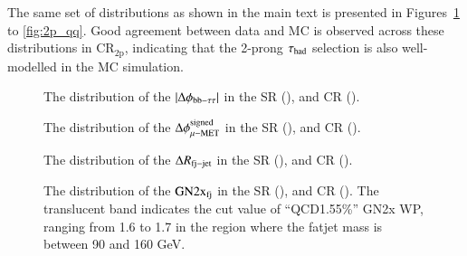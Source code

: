     The same set of distributions as shown in the main text is presented in Figures~\ref{fig:2p_absDphi_bbtt} to \ref{fig:2p_qq}. 
    Good agreement between data and MC is observed across these distributions in $\mathrm{CR}_\mathrm{2p}$, 
    indicating that the 2-prong $\tau_{\text{had}}$ selection is also well-modelled in the MC simulation. 

    \begin{figure}[htbp]
        \centering
        \caption{
            The distribution of the $|\Delta\phi_\mathrm{bb-\tau\tau}|$ in the SR (\protect{}), and CR (\protect{}).
        }    
        \label{fig:2p_absDphi_bbtt}
    \end{figure}

    \begin{figure}[htbp]
        \centering
        \caption{
            The distribution of the $\Delta\phi^\mathrm{signed}_\mathrm{\mu-MET}$ in the SR (\protect{}), and CR (\protect{}).
        }
        \label{fig:2p_dPhi_mu_met}
    \end{figure}

    \begin{figure}[htbp]
        \centering
        \caption{
            The distribution of the $\Delta R_\mathrm{fj-jet}$ in the SR (\protect{}), and CR (\protect{}).
        }
        \label{fig:2p_dR_jfj}
    \end{figure}

    \begin{figure}[htbp]
        \centering
        \caption{
            The distribution of the $\mathrm{GN2x}_\mathrm{fj}$ in the SR (\protect{}), and CR (\protect{}). 
            The translucent band indicates the cut value of ``QCD1.55\%'' GN2x WP, ranging from 1.6 to 1.7 in the region where the fatjet mass is between 90 and 160 GeV.
        }
        \label{fig:2p_GN2bb}
    \end{figure}

